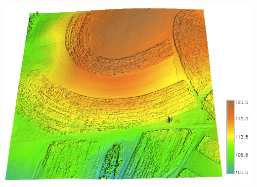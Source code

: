 \documentclass[xcolor={dvipsnames,usenames},beamer,aspectratio=169]{beamer}
\begin{document}
\begin{frame}{\coursesTitle}
\begin{columns}[c]
\includegraphics[height=0.5\textheight]{./images/edu/dem}
\hspace{0.2\textwidth}
\end{columns}

\end{frame}
\end{document}

